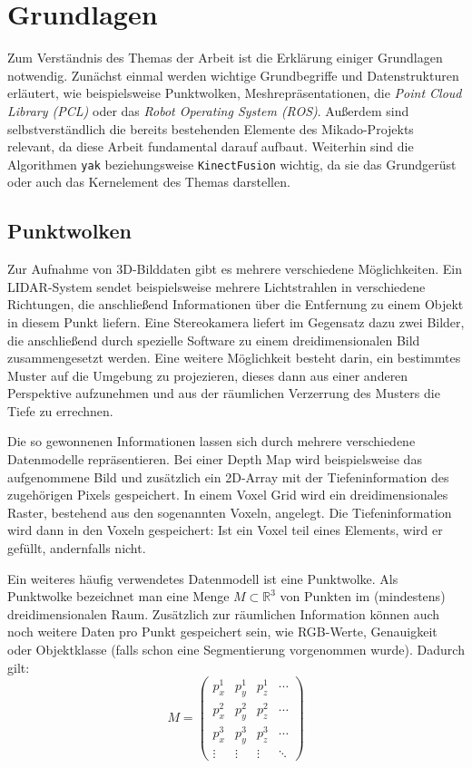 
\chapter{Grundlagen}

Zum Verständnis des Themas der Arbeit ist die Erklärung einiger Grundlagen notwendig.
Zunächst einmal werden wichtige Grundbegriffe und Datenstrukturen erläutert, wie beispielsweise Punktwolken, Meshrepräsentationen, die \textit{Point Cloud Library (PCL)} oder das \textit{Robot Operating System (ROS)}.
Außerdem sind selbstverständlich die bereits bestehenden Elemente des Mikado-Projekts relevant, da diese Arbeit fundamental darauf aufbaut.
Weiterhin sind die Algorithmen \texttt{yak} beziehungsweise \texttt{KinectFusion} wichtig, da sie das Grundgerüst oder auch das Kernelement des Themas darstellen.


\section{Punktwolken}

Zur Aufnahme von 3D-Bilddaten gibt es mehrere verschiedene Möglichkeiten.
Ein LIDAR-System sendet beispielsweise mehrere Lichtstrahlen in verschiedene Richtungen, die anschließend Informationen über die Entfernung zu einem Objekt in diesem Punkt liefern.
Eine Stereokamera liefert im Gegensatz dazu zwei Bilder, die anschließend durch spezielle Software zu einem dreidimensionalen Bild zusammengesetzt werden.
Eine weitere Möglichkeit besteht darin, ein bestimmtes Muster auf die Umgebung zu projezieren, dieses dann aus einer anderen Perspektive aufzunehmen und aus der räumlichen Verzerrung des Musters die Tiefe zu errechnen.

Die so gewonnenen Informationen lassen sich durch mehrere verschiedene Datenmodelle repräsentieren.
Bei einer Depth Map wird beispielsweise das aufgenommene Bild und zusätzlich ein 2D-Array mit der Tiefeninformation des zugehörigen Pixels gespeichert.
In einem Voxel Grid wird ein dreidimensionales Raster, bestehend aus den sogenannten Voxeln, angelegt.
Die Tiefeninformation wird dann in den Voxeln gespeichert: Ist ein Voxel teil eines Elements, wird er gefüllt, andernfalls nicht.

Ein weiteres häufig verwendetes Datenmodell ist eine Punktwolke.
Als Punktwolke bezeichnet man eine Menge $M \subset \mathbb{R}^3$ von Punkten im (mindestens) dreidimensionalen Raum.
Zusätzlich zur räumlichen Information können auch noch weitere Daten pro Punkt gespeichert sein, wie RGB-Werte, Genauigkeit oder Objektklasse (falls schon eine Segmentierung vorgenommen wurde).
Dadurch gilt:
$$M = \begin{pmatrix}
p_x^1 & p_y^1 & p_z^1 & \cdots\\
p_x^2 & p_y^2 & p_z^2 & \cdots\\
p_x^3 & p_y^3 & p_z^3 & \cdots\\
\vdots & \vdots & \vdots & \ddots
\end{pmatrix}$$

